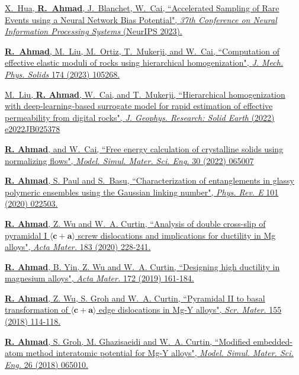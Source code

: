 \documentclass[margin,line]{resume}
\begin{document}
\begin{resume}
    \href{https://openreview.net/pdf?id=NyXTjtFojv}{X.~Hua, \textbf{R.~Ahmad}, J.~Blanchet, W.~Cai, ``Accelerated Sampling of Rare Events using a Neural
        Network Bias Potential", \textit{37th Conference on Neural Information Processing Systems} (NeurIPS 2023).}

    \href{https://www.sciencedirect.com/science/article/abs/pii/S0022509623000728?via%3Dihub}{\textbf{R.~Ahmad}, M.~Liu, M.~Ortiz, T.~Mukerji, and W.~Cai, ``Computation of effective elastic moduli of rocks using hierarchical homogenization", \textit{J. Mech. Phys. Solids} 174 (2023) 105268.}

    \href{https://agupubs.onlinelibrary.wiley.com/doi/abs/10.1029/2022JB025378} {M.~Liu, \textbf{R. Ahmad}, W.~Cai, and T.~Mukerji, ``Hierarchical homogenization with deep-learning-based surrogate model for rapid estimation of effective permeability from digital rocks", \textit{J. Geophys. Research: Solid Earth} (2022) e2022JB025378}

    \href{https://iopscience.iop.org/article/10.1088/1361-651X/ac7f4b} {\textbf{R. Ahmad}, and W.~Cai, ``Free energy calculation of crystalline solids using normalizing flows", \textit{Model. Simul. Mater. Sci. Eng.} 30 (2022) 065007}

    \href{https://journals.aps.org/pre/abstract/10.1103/PhysRevE.101.022503} {\textbf{R. Ahmad}, S. Paul and S.~Basu, ``Characterization of entanglements in glassy polymeric ensembles using the Gaussian linking number", \textit{Phys. Rev. E} 101 (2020) 022503.}

    \href{https://www.sciencedirect.com/science/article/pii/S1359645419307256} {\textbf{R. Ahmad}, Z. Wu and W.~A.
        Curtin, ``Analysis of double cross-slip of pyramidal I $\langle \boldsymbol{c} + \boldsymbol{a} \rangle$ screw dislocations and implications for ductility in Mg alloys", \textit{Acta Mater.} 183 (2020) 228-241.}

    \href{https://www.sciencedirect.com/science/article/pii/S1359645419302198} {\textbf{R. Ahmad}, B. Yin, Z. Wu and W.~A. Curtin, ``Designing high ductility in magnesium alloys", \textit{Acta Mater.} 172 (2019) 161-184.}

    \href{https://www.sciencedirect.com/science/article/pii/S1359646218303804}{\textbf{R. Ahmad}, Z. Wu, S. Groh and W.~A. Curtin, ``Pyramidal II to basal transformation of $\langle \boldsymbol{c} + \boldsymbol{a} \rangle$ edge dislocations in Mg-Y alloys", \textit{Scr. Mater.} 155 (2018) 114-118.}

    \href{https://iopscience.iop.org/article/10.1088/1361-651X/aacfd2}{\textbf{R. Ahmad}, S. Groh, M. Ghazisaeidi and W.~A. Curtin, ``Modified embedded-atom method interatomic potential for Mg-Y alloys", \textit{Model. Simul. Mater. Sci. Eng.} 26 (2018) 065010.}



\end{resume}
\end{document}
